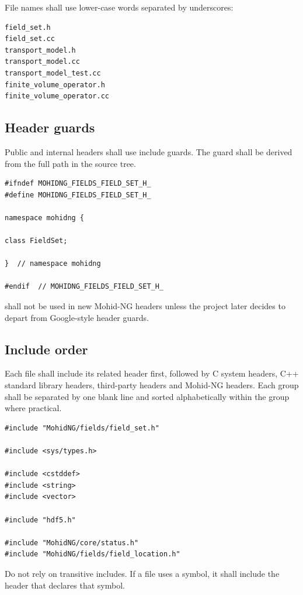 \documentclass[11pt,a4paper]{article}
\newcommand{\Code}[1]{\texttt{\detokenize{#1}}}
\begin{document}
File names shall use lower-case words separated by underscores:

\begin{lstlisting}[language={}]
field_set.h
field_set.cc
transport_model.h
transport_model.cc
transport_model_test.cc
finite_volume_operator.h
finite_volume_operator.cc
\end{lstlisting}

\subsection{Header guards}

Public and internal headers shall use include guards. The guard shall be derived from the full path in the source tree.

\begin{lstlisting}
#ifndef MOHIDNG_FIELDS_FIELD_SET_H_
#define MOHIDNG_FIELDS_FIELD_SET_H_

namespace mohidng {

class FieldSet;

}  // namespace mohidng

#endif  // MOHIDNG_FIELDS_FIELD_SET_H_
\end{lstlisting}

\Code{\#pragma once} shall not be used in new Mohid-NG headers unless the project later decides to depart from Google-style header guards.

\subsection{Include order}

Each \Code{.cc} file shall include its related header first, followed by C system headers, C++ standard library headers, third-party headers and Mohid-NG headers. Each group shall be separated by one blank line and sorted alphabetically within the group where practical.

\begin{lstlisting}
#include "MohidNG/fields/field_set.h"

#include <sys/types.h>

#include <cstddef>
#include <string>
#include <vector>

#include "hdf5.h"

#include "MohidNG/core/status.h"
#include "MohidNG/fields/field_location.h"
\end{lstlisting}

Do not rely on transitive includes. If a file uses a symbol, it shall include the header that declares that symbol.
\end{document}
